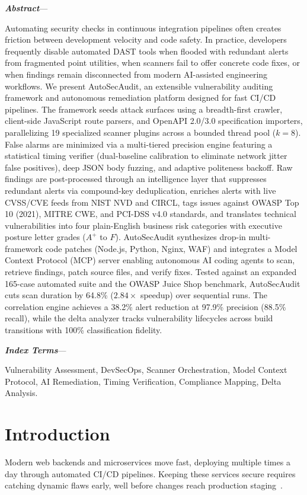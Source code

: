 \documentclass[conference]{IEEEtran}
\renewenvironment{abstract}{%
  \normalfont\small
  \textbf{\textit{Abstract}}---%
  \ignorespaces
}{\par\normalfont\normalsize}
\renewenvironment{IEEEkeywords}{%
  \normalfont\small
  \textbf{\textit{Index Terms}}---%
  \ignorespaces
}{\par\normalfont\normalsize}
\begin{document}
\begin{abstract}
Automating security checks in continuous integration pipelines often creates friction between development velocity and code safety. In practice, developers frequently disable automated DAST tools when flooded with redundant alerts from fragmented point utilities, when scanners fail to offer concrete code fixes, or when findings remain disconnected from modern AI-assisted engineering workflows. We present AutoSecAudit, an extensible vulnerability auditing framework and autonomous remediation platform designed for fast CI/CD pipelines. The framework seeds attack surfaces using a breadth-first crawler, client-side JavaScript route parsers, and OpenAPI 2.0/3.0 specification importers, parallelizing 19 specialized scanner plugins across a bounded thread pool ($k=8$). False alarms are minimized via a multi-tiered precision engine featuring a statistical timing verifier (dual-baseline calibration to eliminate network jitter false positives), deep JSON body fuzzing, and adaptive politeness backoff. Raw findings are post-processed through an intelligence layer that suppresses redundant alerts via compound-key deduplication, enriches alerts with live CVSS/CVE feeds from NIST NVD and CIRCL, tags issues against OWASP Top 10 (2021), MITRE CWE, and PCI-DSS v4.0 standards, and translates technical vulnerabilities into four plain-English business risk categories with executive posture letter grades ($A^+$ to $F$). AutoSecAudit synthesizes drop-in multi-framework code patches (Node.js, Python, Nginx, WAF) and integrates a Model Context Protocol (MCP) server enabling autonomous AI coding agents to scan, retrieve findings, patch source files, and verify fixes. Tested against an expanded 165-case automated suite and the OWASP Juice Shop benchmark, AutoSecAudit cuts scan duration by 64.8\% ($2.84\times$ speedup) over sequential runs. The correlation engine achieves a 38.2\% alert reduction at 97.9\% precision (88.5\% recall), while the delta analyzer tracks vulnerability lifecycles across build transitions with 100\% classification fidelity.
\end{abstract}

\begin{IEEEkeywords}
Vulnerability Assessment, DevSecOps, Scanner Orchestration, Model Context Protocol, AI Remediation, Timing Verification, Compliance Mapping, Delta Analysis.
\end{IEEEkeywords}

\section{Introduction}
Modern web backends and microservices move fast, deploying multiple times a day through automated CI/CD pipelines. Keeping these services secure requires catching dynamic flaws early, well before changes reach production staging~\cite{myrbakken2017devsecops}.
\end{document}
